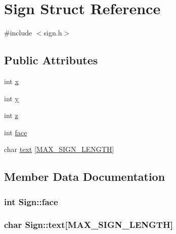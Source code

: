 \hypertarget{structSign}{}\section{Sign Struct Reference}
\label{structSign}


{\ttfamily \#include $<$sign.\+h$>$}

\subsection*{Public Attributes}
\begin{DoxyCompactItemize}
\item 
int \hyperlink{structSign_a9672fe58fa3a1d75c9511fe8259eb4e6}{x}
\item 
int \hyperlink{structSign_afdd7a7b76acc62dfd45965caed37c3f3}{y}
\item 
int \hyperlink{structSign_a5eb6412ecae2da81951ffdf073a994ed}{z}
\item 
int \hyperlink{structSign_a5a5f53a409cd7ec36733fc80e6d25785}{face}
\item 
char \hyperlink{structSign_aa3053ca28e2fecc26cfbef7797da4646}{text} \mbox{[}\hyperlink{sign_8h_a710dbda73a9300c41fa70abbc375b912}{M\+A\+X\+\_\+\+S\+I\+G\+N\+\_\+\+L\+E\+N\+G\+TH}\mbox{]}
\end{DoxyCompactItemize}


\subsection{Member Data Documentation}
\subsubsection[{\texorpdfstring{face}{face}}]{\setlength{\rightskip}{0pt plus 5cm}int Sign\+::face}\hypertarget{structSign_a5a5f53a409cd7ec36733fc80e6d25785}{}\label{structSign_a5a5f53a409cd7ec36733fc80e6d25785}
\subsubsection[{\texorpdfstring{text}{text}}]{\setlength{\rightskip}{0pt plus 5cm}char Sign\+::text\mbox{[}{\bf M\+A\+X\+\_\+\+S\+I\+G\+N\+\_\+\+L\+E\+N\+G\+TH}\mbox{]}}\hypertarget{structSign_aa3053ca28e2fecc26cfbef7797da4646}{}\label{structSign_aa3053ca28e2fecc26cfbef7797da4646}
